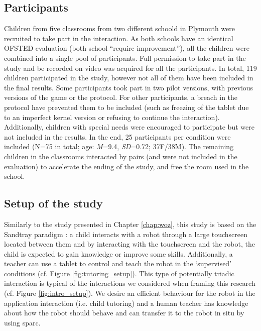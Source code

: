 \subsection{Participants}

Children from five classrooms from two different schoold in Plymouth were recruited to take part in the interaction. As both schools have an identical OFSTED evaluation (both school ``require improvement''), all the children were combined into a single pool of participants. Full permission to take part in the study and be recorded on video was acquired for all the participants. In total, 119 children participated in the study, however not all of them have been included in the final results. Some participants took part in two pilot versions, with previous versions of the game or the protocol. For other participants, a breach in the protocol have prevented them to be included (such as freezing of the tablet due to an imperfect kernel version or refusing to continue the interaction). Additionally, children with special needs were encouraged to participate but were not included in the results. In the end, 25 participants per condition were included (N=75 in total; age: \textit{M}=9.4, \textit{SD}=0.72; 37F/38M). The remaining children in the classrooms interacted by pairs (and were not included in the evaluation) to accelerate the ending of the study, and free the room used in the school. 

\subsection{Setup of the study}

Similarly to the study presented in Chapter \ref{chap:woz}, this study is based on the Sandtray paradigm \citep{baxter2012touchscreen}: a child interacts with a robot through a large touchscreen located between them and by interacting with the touchscreen and the robot, the child is expected to gain knowledge or improve some skills. Additionally, a teacher can use a tablet to control and teach the robot in the `supervised' conditions (cf. Figure \ref{fig:tutoring_setup}). This type of potentially triadic interaction is typical of the interactions we considered when framing this research (cf. Figure \ref{fig:intro_setup}). We desire an efficient behaviour for the robot in the application interaction (i.e. child tutoring) and a human teacher has knowledge about how the robot should behave and can transfer it to the robot in situ by using \gls{sparc}.

